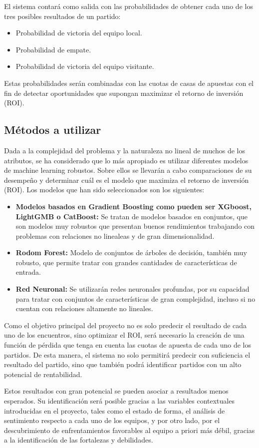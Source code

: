 El sistema contará como salida con las probabilidades de obtener cada uno de los tres posibles resultados de un partido:
\begin{itemize}
    \item Probabilidad de victoria del equipo local.
    \item Probabilidad de empate.
    \item Probabilidad de victoria del equipo visitante.
\end{itemize}

Estas probabilidades serán combinadas con las cuotas de casas de apuestas con el fin de detectar oportunidades que supongan maximizar el retorno de inversión (ROI).

\subsection{Métodos a utilizar}

Dada a la complejidad del problema y la naturaleza no lineal de muchos de los atributos, se ha considerado que lo más apropiado es utilizar diferentes modelos de machine learning robustos. Sobre ellos se llevarán a cabo comparaciones de su desempeño y determinar cuál es el modelo que maximiza el retorno de inversión (ROI). Los modelos que han sido seleccionados son los siguientes:

\begin{itemize}
    \item \textbf{Modelos basados en Gradient Boosting como pueden ser XGboost, LightGMB o CatBoost:} Se tratan de modelos basados en conjuntos, que son modelos muy robustos que presentan buenos rendimientos trabajando con problemas con relaciones no linealeas y de gran dimensionalidad.
    \item \textbf{Rodom Forest:} Modelo de conjuntos de árboles de decisión, también muy robusto, que permite tratar con grandes cantidades de características de entrada.
    \item \textbf{Red Neuronal:} Se utilizarán redes neuronales profundas, por su capacidad para tratar con conjuntos de características de gran complejidad, incluso si no cuentan con relaciones altamente no lineales.
\end{itemize}


Como el objetivo principal del proyecto no es solo predecir el resultado de cada uno de los encuentros, sino optimizar el ROI, será necesario la creación de una función de pérdida que tenga en cuenta las cuotas de apuesta de cada uno de los partidos. De esta manera, el sistema no solo permitirá predecir con suficiencia el resultado del partido, sino que también podrá identificar partidos con un alto potencial de rentabilidad.

Estos resultados con gran potencial se pueden asociar a resultados menos esperados. Su identificación será posible gracias a las variables contextuales introducidas en el proyecto, tales como el estado de forma, el análisis de sentimiento respecto a cada uno de los equipos, y por otro lado, por el descubrimiento de enfrentamientos favorables al equipo a priori más débil, gracias a la identificación de las fortalezas y debilidades.